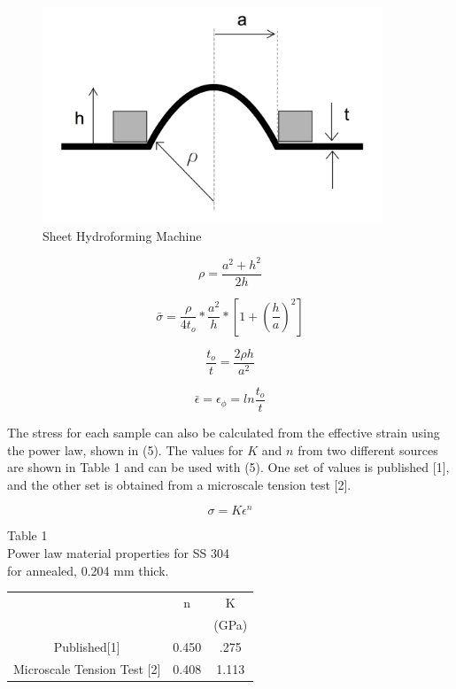 \documentclass[12pt]{article}
\begin{document}
\begin{figure}[htbp] %
   \centering
   \includegraphics[width=4in]{hydroforming_sample.jpg} 
   \caption{Sheet Hydroforming Machine}
   \label{fig:example}
\end{figure}

\newpage

\begin{equation}
\rho = \frac{a^2+h^2}{2h}
\end{equation}
\bigskip

\begin{equation}
\bar{\sigma}=\frac{\rho}{4t_{o}}*\frac{a^2}{h}*\left[1+\left(\frac{h}{a}\right)^2\right]
\end{equation}
\bigskip

\begin{equation}
\frac{t_{o}}{t} = \frac{2\rho h}{a^2}
\end{equation}
\bigskip

\begin{equation}
\bar{\epsilon}=\epsilon_{\phi}=ln\frac{t_{o}}{t}
\end{equation}
\bigskip
\bigskip



The stress for each sample can also be calculated from the effective strain using the power law, shown in (5). The values for $K$ and $n$ from two different sources are shown in Table 1 and can be used with (5). One set of values is published [1], and the other set is obtained from a microscale tension test [2]. 
\bigskip


\begin{equation}
\sigma=K\epsilon^n
\end{equation}
\bigskip


\begin{center}
Table 1\\
Power law material properties for SS 304 \\
for annealed, 0.204 mm thick. \\
\begin{tabular}{ c c c}
\hline
 & n & K \\
 &    & (GPa)\\
\hline
Published[1] & 0.450 &.275\\
Microscale Tension Test [2] & 0.408 & 1.113\\
\hline
\end{tabular}
\end{center}
\bigskip
\bigskip
\end{document}
